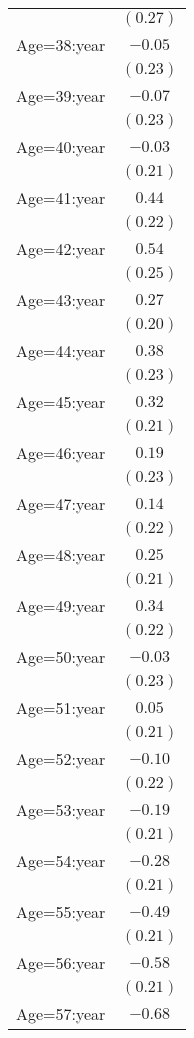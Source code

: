 \documentclass[fullpage]{paper}
\begin{document}
\begin{center}
\begin{longtable}{l c }
            & $(0.27)$ \\
Age=38:year & $-0.05$  \\
            & $(0.23)$ \\
Age=39:year & $-0.07$  \\
            & $(0.23)$ \\
Age=40:year & $-0.03$  \\
            & $(0.21)$ \\
Age=41:year & $0.44$   \\
            & $(0.22)$ \\
Age=42:year & $0.54$   \\
            & $(0.25)$ \\
Age=43:year & $0.27$   \\
            & $(0.20)$ \\
Age=44:year & $0.38$   \\
            & $(0.23)$ \\
Age=45:year & $0.32$   \\
            & $(0.21)$ \\
Age=46:year & $0.19$   \\
            & $(0.23)$ \\
Age=47:year & $0.14$   \\
            & $(0.22)$ \\
Age=48:year & $0.25$   \\
            & $(0.21)$ \\
Age=49:year & $0.34$   \\
            & $(0.22)$ \\
Age=50:year & $-0.03$  \\
            & $(0.23)$ \\
Age=51:year & $0.05$   \\
            & $(0.21)$ \\
Age=52:year & $-0.10$  \\
            & $(0.22)$ \\
Age=53:year & $-0.19$  \\
            & $(0.21)$ \\
Age=54:year & $-0.28$  \\
            & $(0.21)$ \\
Age=55:year & $-0.49$  \\
            & $(0.21)$ \\
Age=56:year & $-0.58$  \\
            & $(0.21)$ \\
Age=57:year & $-0.68$  \\

\end{longtable}
\end{center}
\end{document}
